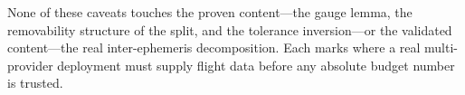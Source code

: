 None of these caveats touches the proven content---the gauge lemma, the removability
structure of the split, and the tolerance inversion---or the validated content---the
real inter-ephemeris decomposition. Each marks where a real multi-provider deployment
must supply flight data before any absolute budget number is trusted.
